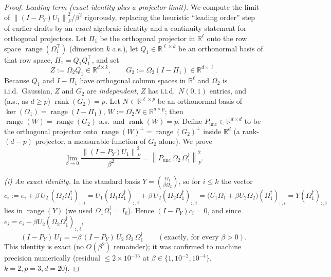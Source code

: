 \documentclass{amsart}
\theoremstyle{definition}
\DeclareMathOperator{\rank}{rank}
\DeclareMathOperator{\range}{range}
\newcommand{\R}{\mathbb{R}}
\newcommand{\Frob}[1]{\left\lVert #1\right\rVert_F}
\begin{document}
\begin{proof}
\emph{Leading term (exact identity plus a projector limit).} We compute the
limit of $\Frob{(I-P_Y)U_1}^2/\beta^2$ rigorously, replacing the heuristic
``leading order'' step of earlier drafts by an \emph{exact} algebraic identity
and a continuity statement for orthogonal projectors. Let $\Pi_1$ be the
orthogonal projector in $\R^\ell$ onto the row space $\range(\Omega_1^\top)$
(dimension $k$ a.s.), let $Q_1\in\R^{\ell\times k}$ be an orthonormal basis of
that row space, $\Pi_1=Q_1Q_1^\top$, and set
\begin{equation}\label{eq:ZG2def}
Z:=\Omega_2 Q_1\in\R^{d\times k},\qquad G_2:=\Omega_2(I-\Pi_1)\in\R^{d\times\ell}.
\end{equation}
Because $Q_1$ and $I-\Pi_1$ have orthogonal column spaces in $\R^\ell$ and
$\Omega_2$ is i.i.d.\ Gaussian, $Z$ and $G_2$ are \emph{independent}, $Z$ has
i.i.d.\ $N(0,1)$ entries, and (a.s., as $d\ge p$) $\rank(G_2)=p$. Let
$N\in\R^{\ell\times p}$ be an orthonormal basis of $\ker(\Omega_1)=\range(I-\Pi_1)$,
$W:=\Omega_2 N\in\R^{d\times p}$; then $\range(W)=\range(G_2)$ a.s.\ and
$\rank(W)=p$. Define $P_{\mathrm{unc}}\in\R^{d\times d}$ to be the orthogonal
projector onto $\range(W)^{\perp}=\range(G_2)^{\perp}$ inside $\R^d$ (a
rank-$(d-p)$ projector, a measurable function of $G_2$ alone). We prove
\begin{equation}\label{eq:firstorder}
\lim_{\beta\to0}\frac{\Frob{(I-P_Y)U_1}^2}{\beta^2}
=\Frob{P_{\mathrm{unc}}\,\Omega_2\,\Omega_1^{\dagger}}^2 .
\end{equation}

\emph{(i) An exact identity.} In the standard basis
$Y=\binom{\Omega_1}{\beta\Omega_2}$, so for $i\le k$ the vector
\[
c_i:=e_i+\beta\,U_2\,(\Omega_2\Omega_1^{\dagger})_{:,i}
=U_1(\Omega_1\Omega_1^{\dagger})_{:,i}+\beta\,U_2(\Omega_2\Omega_1^{\dagger})_{:,i}
=\big(U_1\Omega_1+\beta U_2\Omega_2\big)(\Omega_1^{\dagger})_{:,i}
=Y(\Omega_1^{\dagger})_{:,i}
\]
lies in $\range(Y)$ (we used $\Omega_1\Omega_1^{\dagger}=I_k$). Hence
$(I-P_Y)c_i=0$, and since $e_i=c_i-\beta U_2(\Omega_2\Omega_1^{\dagger})_{:,i}$,
\begin{equation}\label{eq:exactid}
(I-P_Y)\,U_1=-\beta\,(I-P_Y)\,U_2\,\Omega_2\,\Omega_1^{\dagger}
\qquad(\text{exactly, for every }\beta>0).
\end{equation}
This identity is exact (no $O(\beta^2)$ remainder); it was confirmed to machine
precision numerically (residual $\le2\times10^{-15}$ at $\beta\in\{1,10^{-2},10^{-4}\}$,
$k=2,p=3,d=20$).


\end{proof}
\end{document}
